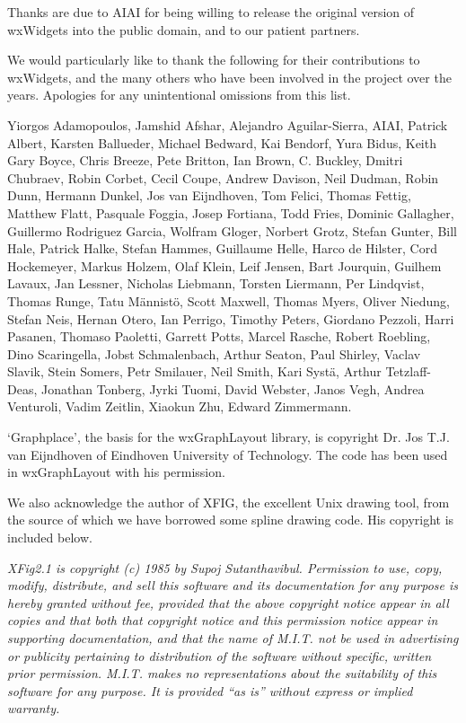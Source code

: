 Thanks are due to AIAI for being willing to release the original version of
wxWidgets into the public domain, and to our patient partners.

We would particularly like to thank the following for their contributions to wxWidgets, and the many others who have been involved in
the project over the years. Apologies for any unintentional omissions from this list. 
 
Yiorgos Adamopoulos, Jamshid Afshar, Alejandro Aguilar-Sierra, AIAI, Patrick Albert, Karsten Ballueder, Michael Bedward, Kai Bendorf, Yura Bidus, Keith 
Gary Boyce, Chris Breeze, Pete Britton, Ian Brown, C. Buckley, Dmitri Chubraev, Robin Corbet, Cecil Coupe, Andrew Davison, Neil Dudman, Robin 
Dunn, Hermann Dunkel, Jos van Eijndhoven, Tom Felici, Thomas Fettig, Matthew Flatt, Pasquale Foggia, Josep Fortiana, Todd Fries, Dominic Gallagher, 
Guillermo Rodriguez Garcia, Wolfram Gloger, Norbert Grotz, Stefan Gunter, Bill Hale, Patrick Halke, Stefan Hammes, Guillaume Helle, Harco de Hilster, Cord Hockemeyer, Markus 
Holzem, Olaf Klein, Leif Jensen, Bart Jourquin, Guilhem Lavaux, Jan Lessner, Nicholas Liebmann, Torsten Liermann, Per Lindqvist, Thomas Runge, Tatu
M\"{a}nnist\"{o}, Scott Maxwell, Thomas Myers, Oliver Niedung, Stefan Neis, Hernan Otero, Ian Perrigo, Timothy Peters, Giordano Pezzoli, Harri Pasanen, Thomaso Paoletti, 
Garrett Potts, Marcel Rasche, Robert Roebling, Dino Scaringella, Jobst Schmalenbach, Arthur Seaton, Paul Shirley, Vaclav Slavik, Stein Somers, Petr Smilauer, Neil Smith, 
Kari Syst\"{a}, Arthur Tetzlaff-Deas, Jonathan Tonberg, Jyrki Tuomi, David Webster, Janos Vegh, Andrea Venturoli, Vadim Zeitlin, Xiaokun Zhu, Edward Zimmermann.

`Graphplace', the basis for the wxGraphLayout library, is copyright Dr. Jos
T.J. van Eijndhoven of Eindhoven University of Technology. The code has
been used in wxGraphLayout with his permission.

We also acknowledge the author of XFIG, the excellent Unix drawing tool,
from the source of which we have borrowed some spline drawing code.
His copyright is included below.

{\it XFig2.1 is copyright (c) 1985 by Supoj Sutanthavibul. Permission to
use, copy, modify, distribute, and sell this software and its
documentation for any purpose is hereby granted without fee, provided
that the above copyright notice appear in all copies and that both that
copyright notice and this permission notice appear in supporting
documentation, and that the name of M.I.T. not be used in advertising or
publicity pertaining to distribution of the software without specific,
written prior permission.  M.I.T. makes no representations about the
suitability of this software for any purpose.  It is provided ``as is''
without express or implied warranty.}

